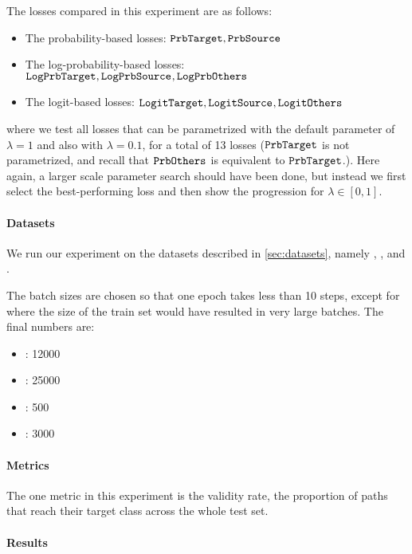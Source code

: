 \documentclass[../main.tex]{subfiles}
\begin{document}
The losses compared in this experiment are as follows:
\begin{itemize}
    \item The probability-based losses: $\mathtt{PrbTarget}, \mathtt{PrbSource}_{}$
    \item The log-probability-based losses: $\mathtt{LogPrbTarget}, \mathtt{LogPrbSource}_{}, \mathtt{LogPrbOthers}_{}$
    \item The logit-based losses: $\mathtt{LogitTarget}, \mathtt{LogitSource}_{}, \mathtt{LogitOthers}_{}$
\end{itemize}
where we test all losses that can be parametrized with the default parameter of $\lambda = 1$ and also with $\lambda = 0.1$, for a total of 13 losses ($\mathtt{PrbTarget}$ is not parametrized, and recall that $\mathtt{PrbOthers}_{}$ is equivalent to $\mathtt{PrbTarget}$.).
Here again, a larger scale parameter search should have been done, but instead we first select the best-performing loss and then show the progression for $\lambda \in [0, 1]$.

\paragraph{Datasets}

We run our experiment on the datasets described in \autoref{sec:datasets}, namely \CakeOnSea, \ForestCover, \WineQuality{} and \OnlineNewsPopularity.

The batch sizes are chosen so that one epoch takes less than 10 steps, except for \ForestCover{} where the size of the train set would have resulted in very large batches.
The final numbers are:
\begin{itemize}
    \item \CakeOnSea: 12000
    \item \ForestCover: 25000
    \item \WineQuality: 500
    \item \OnlineNewsPopularity: 3000
\end{itemize}

\paragraph{Metrics}

The one metric in this experiment is the validity rate, \ie{} the proportion of paths that reach their target class across the whole test set.

\paragraph{Results}
\end{document}
